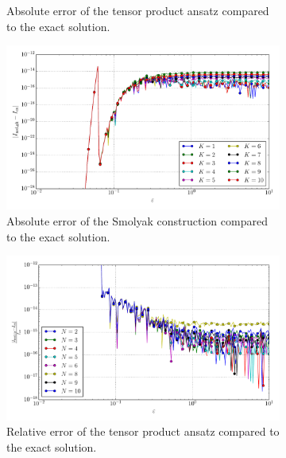 \documentclass[a4paper,10pt]{article}
\begin{document}
\begin{figure}[ht!]
\begin{subfigure}[t]{0.5\linewidth}
    \caption{Absolute error of the tensor product ansatz compared to the exact solution.}
    \label{fig:tp_sg_3d_conv_p_000_000_err_nsd_tp}
  \end{subfigure}
  \begin{subfigure}[t]{0.5\linewidth}
    \includegraphics[width=\linewidth]{./plots/tp_sg_3d_conv_eps_(0,0,0)_(0,0,0)_err_nsd_gk.pdf}
    \caption{Absolute error of the Smolyak construction compared to the exact solution.}
    \label{fig:tp_sg_3d_conv_p_000_000_err_nsd_gk}
  \end{subfigure}
  \begin{subfigure}[t]{0.5\linewidth}
    \includegraphics[width=\linewidth]{./plots/tp_sg_3d_conv_eps_(0,0,0)_(0,0,0)_err_rel_nsd_tp.pdf}
    \caption{Relative error of the tensor product ansatz compared to the exact solution.}
    \label{fig:tp_sg_3d_conv_p_000_000_err_rel_nsd_tp}
  \end{subfigure}
  \begin{subfigure}[t]{0.5\linewidth}

\end{subfigure}
\end{figure}
\end{document}

